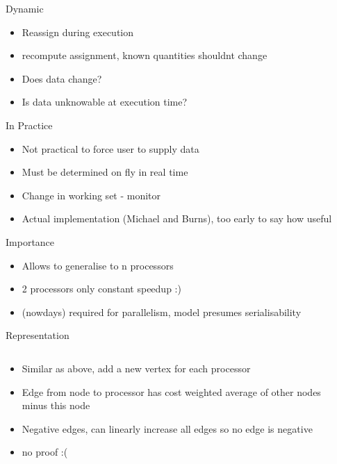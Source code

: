 \documentclass{beamer}
\begin{document}
\begin{frame}{Dynamic}
\begin{itemize}
	\item Reassign during execution
	\item recompute assignment, known quantities shouldnt change
	\item Does data change?
	\item Is data unknowable at execution time?
\end{itemize}
\end{frame}

\begin{frame}{In Practice}
\begin{itemize}
	\item Not practical to force user to supply data
	\item Must be determined on fly in real time
	\item Change in working set - monitor
	\item Actual implementation (Michael and Burns), too early to say how useful
\end{itemize}
\end{frame}

\begin{frame}{Importance}
\begin{itemize}
	\item Allows to generalise to n processors
	\item 2 processors only constant speedup :)
	\item (nowdays) required for parallelism, model presumes serialisability
\end{itemize}
\end{frame}

\begin{frame}{Representation}
\begin{columns}
\begin{column}{5cm}
\begin{itemize}
	\item Similar as above, add a new vertex for each processor
	\item Edge from node to processor has cost weighted average of other nodes minus this node
	\item Negative edges, can linearly increase all edges so no edge is negative
	\item no proof :(
\end{itemize}
\end{column}
\begin{column}{5cm}
\end{column}
\end{columns}
\end{frame}
\end{document}
